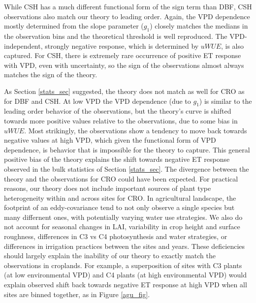 \documentclass[draft,linenumbers]{agujournal}
\begin{document}
While CSH has a much different functional form of the sign term than DBF, CSH observations also match our theory to leading order. Again, the VPD dependence mostly determined from the slope parameter ($g_1$) closely matches the medians in the observation bins and the theoretical threshold is well reproduced. The VPD-independent, strongly negative response, which is determined by $uWUE$, is also captured. For CSH, there is extremely rare occurrence of positive ET response with VPD, even with uncertainty, so the sign of the observations almost always matches the sign of the theory.

As Section \ref{stats_sec} suggested, the theory does not match as well for CRO as for DBF and CSH. At low VPD the VPD dependence (due to $g_1$) is similar to the leading order behavior of the observations, but the theory's curve is shifted towards more positive values relative to the observations, due to some bias in $uWUE$. Most strikingly, the observations show a tendency to move back towards negative values at high VPD, which given the functional form of VPD dependence, is behavior that is impossible for the theory to capture. This general positive bias of the theory explains the shift towards negative ET response observed in the bulk statistics of Section \ref{stats_sec}. The divergence between the theory and the observations for CRO could have been expected. For practical reasons, our theory does not include important sources of plant type heterogeneity within and across sites for CRO. In agricultural landscape, the footprint of an eddy-covariance tend to not only observe a single species but many differnent ones, with potentially varying water use strategies. We also do not account for seasonal changes in LAI, variability in crop height and surface roughness, differences in C3 vs C4 photosynthesis and water strategies, or differences in irrigation practices between the sites and years. These deficiencies should largely explain the inability of our theory to exactly match the observations in croplands. For example, a superposition of sites with C3 plants (at low environmental VPD) and C4 plants (at high environmental VPD) would explain observed shift back towards negative ET response at high VPD when all sites are binned together, as in Figure \ref{agu_fig}.  
\end{document}
